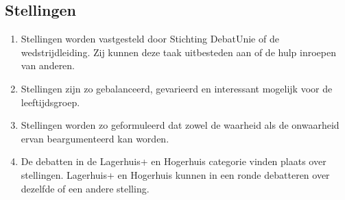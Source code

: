 \subsection{Stellingen}

\begin{enumerate}
\item Stellingen worden vastgesteld door Stichting DebatUnie of de wedstrijdleiding. Zij kunnen deze taak uitbesteden aan of de hulp inroepen van anderen. 
\item Stellingen zijn zo gebalanceerd, gevarieerd en interessant mogelijk voor de leeftijdsgroep.
\item Stellingen worden zo geformuleerd dat zowel de waarheid als de onwaarheid ervan beargumenteerd kan worden.
\item De debatten in de Lagerhuis+ en Hogerhuis categorie vinden plaats over stellingen. Lagerhuis+ en Hogerhuis kunnen in een ronde debatteren over dezelfde of een andere stelling.
\end{enumerate}
